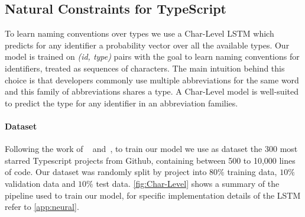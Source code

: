 \documentclass[acmsmall, review, anonymous]{acmart}\settopmatter{printfolios=true,printccs=false,printacmref=false}
\begin{document}


\subsection{Natural Constraints for TypeScript}\label{ssec:natprodts}

To learn naming conventions over types we use a Char-Level LSTM which predicts for any identifier a probability vector over all the available types. Our model is trained on
\textit{(id, type)} pairs with the goal to learn naming conventions
for identifiers, treated as sequences of characters.
The main intuition behind this choice is that
developers commonly use multiple abbreviations for the same word and
this family of abbreviations shares a type.
A Char-Level model is well-suited to predict the type for any identifier in
an abbreviation families.
%
\paragraph{Dataset} Following the work of 
~\citet{wei20} and~\citet{hellendoorn18},
to train our model we use as dataset the 300 
most starred Typescript projects from Github, 
containing between 500 to 10,000 lines of code.
Our dataset was randomly split by project into $80\%$ training data, $10\%$ validation data and $10\%$ test data. \cref{fig:Char-Level} shows a summary of the pipeline used to train our model, for specific implementation details of the LSTM refer to \cref{app:neural}.  
\end{document}
